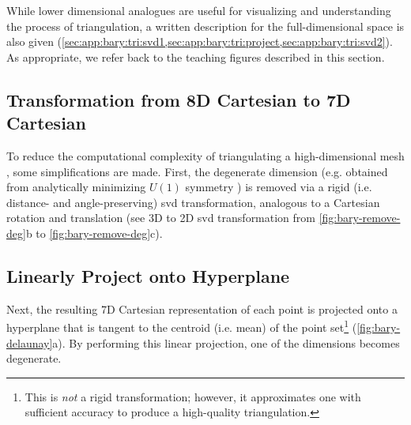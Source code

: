 \documentclass[final,12pt]{elsarticle}
\begin{document}
While lower dimensional analogues are useful for visualizing and understanding the process of triangulation, a written description for the full-dimensional space is also given (\cref{sec:app:bary:tri:svd1,sec:app:bary:tri:project,sec:app:bary:tri:svd2}). As appropriate, we refer back to the teaching figures described in this section.

\subsection{ Transformation from 8D Cartesian to 7D Cartesian}
\label{sec:app:bary:tri:svd1}
To reduce the computational complexity of triangulating a high-dimensional mesh \cite{barberQuickhullAlgorithmConvex1996}, some simplifications are made. First, the degenerate dimension (e.g. obtained from analytically minimizing $U(1)$ symmetry \cite{francisGeodesicOctonionMetric2019}) is removed via a rigid (i.e. distance- and angle-preserving) \gls{svd} transformation,
analogous to a Cartesian rotation and translation (see 3D to 2D \gls{svd} transformation from \cref{fig:bary-remove-deg}b to \cref{fig:bary-remove-deg}c).

\subsection{Linearly Project onto Hyperplane}
\label{sec:app:bary:tri:project}
Next, the resulting 7D Cartesian representation of each point is projected onto a hyperplane that is tangent to the centroid (i.e. mean) of the point set\footnote{This is \textit{not} a rigid transformation; however, it approximates one with sufficient accuracy to produce a high-quality triangulation.} (\cref{fig:bary-delaunay}a). By performing this linear projection, one of the dimensions becomes degenerate.
\end{document}
